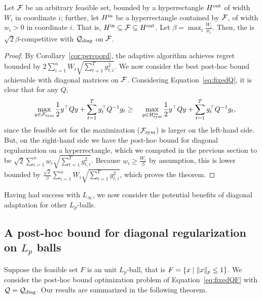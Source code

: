 \begin{theorem}\label{thm:arbcomp}
Let $\mathcal{F}$ be an arbitrary feasible set, bounded by a hyperrectangle
$H^{\text{out}}$ of width $W_i$ in coordinate $i$; further, let $H^{\text{in}}$ be a
hyperrectangle contained by $\mathcal{F}$, of width $w_i > 0$ in coordinate $i$.
That is, $H^{\text{in}} \subseteq \mathcal{F} \subseteq H^{\text{out}}$.  Let $\beta = \max_i
\frac{W_i}{w_i}$.  Then, the \FTPRLdiag
is $\sqrt{2}\beta$-competitive with $\mathcal{Q}_{\text{diag}}$ on $\mathcal{F}$.
\end{theorem}

\begin{proof}
By Corollary~\ref{cor:percoord}, the adaptive algorithm achieves
regret bounded by $2 \sum_{i=1}^n W_i \sqrt{\sum_{t=1}^T g^2_{t, i}}$.
We now consider the best post-hoc bound achievable with diagonal
matrices on $\mathcal{F}$.  Considering Equation~\eqref{eq:fixedQ}, it is
clear that  for any $Q$,
\[
 \quad \max_{y \in \mathcal{F}_{\text{sym}}} \frac{1}{2} y^\top Qy
             + \sum_{t=1}^T g_t^\top Q^{-1}g_t
\geq  
 \quad \max_{y \in H^{\text{in}}_{\text{sym}}} \frac{1}{2} y^\top Qy
             + \sum_{t=1}^T g_t^\top Q^{-1}g_t,
\]
since the feasible set for the maximization ($\mathcal{F}_{\text{sym}}$) is larger on the
left-hand side.  But, on the right-hand side we have the post-hoc
bound for diagonal regularization on a hyperrectangle, which we
computed in the previous section to be
$\sqrt{2} \sum_{i=1}^n w_i \sqrt{\sum_{t=1}^T g^2_{t, i}}$.
Because $w_i \ge \frac {W_i} {\beta}$ by assumption, this is lower bounded by 
$\frac {\sqrt{2}} {\beta} \sum_{i=1}^n W_i \sqrt{\sum_{t=1}^T g^2_{t, i}}$, 
which proves the theorem.
\end{proof}

Having had success with $L_\infty$, we now consider the potential
benefits of diagonal adaptation for other $L_p$-balls.


\subsection{A post-hoc bound for diagonal regularization on $L_p$ balls}
\label{sec:lp_posthoc}

Suppose the feasible set $F$ is an unit $L_p$-ball, that is $F =
\left\{x \mid \| x \|_p \le 1\right\}$.  We consider the post-hoc bound
optimization problem of Equation~\eqref{eq:fixedQF} with $\mathcal{Q} =
\mathcal{Q}_{\text{diag}}$.  Our results are summarized in the following theorem.

